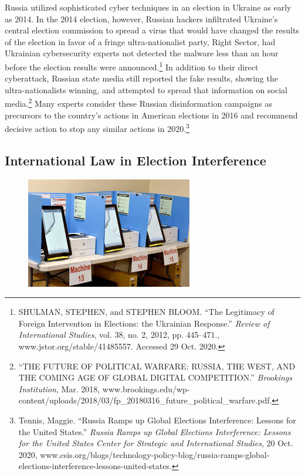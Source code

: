 \documentclass[10pt, letterpaper]{article}
\begin{document}
Russia utilized sophisticated cyber techniques in an election in Ukraine
as early as 2014. In the 2014 election, however, Russian hackers
infiltrated Ukraine's central election commission to spread a virus that
would have changed the results of the election in favor of a fringe
ultra-nationalist party, Right Sector, had Ukrainian cybersecurity
experts not detected the malware less than an hour before the election
results were announced.\footnote{SHULMAN, STEPHEN, and STEPHEN BLOOM.
  ``The Legitimacy of Foreign Intervention in Elections: the Ukrainian
  Response.'' \emph{Review of International Studies}, vol. 38, no. 2,
  2012, pp. 445--471., www.jstor.org/stable/41485557. Accessed 29 Oct.
  2020.} In addition to their direct cyberattack, Russian state media
still reported the fake results, showing the ultra-nationalists winning,
and attempted to spread that information on social media.\footnote{``THE
  FUTURE OF POLITICAL WARFARE: RUSSIA, THE WEST, AND THE COMING AGE OF
  GLOBAL DIGITAL COMPETITION.'' \emph{Brookings Institution}, Mar. 2018,
  www.brookings.edu/wp-content/uploads/2018/03/fp\_20180316\_future\_political\_warfare.pdf.}
Many experts consider these Russian disinformation campaigns as
precursors to the country's actions in American elections in 2016 and
recommend decisive action to stop any similar actions in
2020.\footnote{Tennis, Maggie. ``Russia Ramps up Global Elections
  Interference: Lessons for the United States.'' \emph{Russia Ramps up
  Global Elections Interference: Lessons for the United States
  \textbar{} Center for Strategic and International Studies}, 20 Oct.
  2020,
  www.csis.org/blogs/technology-policy-blog/russia-ramps-global-elections-interference-lessons-united-states.} \\

\subsection{International Law in Election Interference}

\begin{figure}
\centering
\includegraphics[scale = 0.7]{image4.jpg}
\end{figure}
\end{document}
